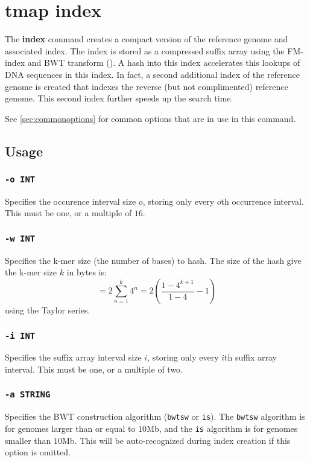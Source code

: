 \documentclass[a4paper,12pt]{book}
\newcommand{\TT}[1]{{\tt #1}} %
\newcommand{\BF}[1]{{\bf #1}} %
\begin{document}
\section{tmap index}
\label{sec:index}
The \BF{index} command creates a compact version of the reference genome and associated index.
The index is stored as a compressed suffix array using the FM-index and BWT transform (\cite{FM-index,BWT}).
A hash into this index accelerates this lookups of DNA sequences in this index.
In fact, a second additional index of the reference genome is created that indexes the reverse (but not complimented) reference genome.
This second index further speeds up the search time.

See \autoref{sec:commonoptions} for common options that are in use in this command.

\subsection{Usage}

\subsubsection{\TT{-o INT}}
Specifies the occurence interval size $o$, storing only every $o$th occurrence interval.
This must be one, or a multiple of $16$.

\subsubsection{\TT{-w INT}}
Specifies the k-mer size (the number of bases) to hash.
The size of the hash give the k-mer size $k$ in bytes is:
\[
= 2 \sum_{n=1}^{k} 4^{n}
= 2 \left(\frac{1 - 4^{k+1}}{1-4} - 1\right)
\]
using the Taylor series.

\subsubsection{\TT{-i INT}}
Specifies the suffix array interval size $i$, storing only every $i$th suffix array interval.
This must be one, or a multiple of two.

\subsubsection{\TT{-a STRING}}
Specifies the BWT construction algorithm (\TT{bwtsw} or \TT{is}).
The \TT{bwtsw} algorithm is for genomes larger than or equal to $10$Mb, and the \TT{is} algorithm is for genomes smaller than $10$Mb.
This will be auto-recognized during index creation if this option is omitted.
\end{document}
